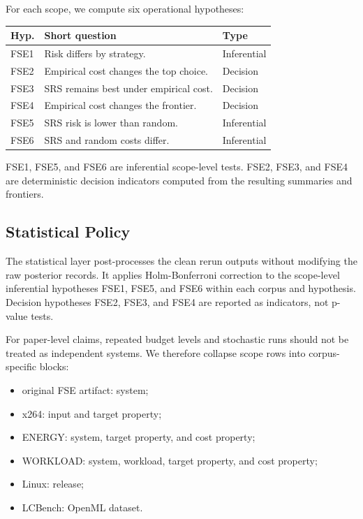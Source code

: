 \documentclass[smallcondensed]{svjour3}
\providecommand{\tightlist}{%
  \setlength{\itemsep}{0pt}\setlength{\parskip}{0pt}}
\begin{document}
For each scope, we compute six operational hypotheses:

\begin{longtable}[]{@{}lll@{}}
\toprule\noalign{}
Hyp. & Short question & Type \\
\midrule\noalign{}
\endhead
\bottomrule\noalign{}
\endlastfoot
FSE1 & Risk differs by strategy. & Inferential \\
FSE2 & Empirical cost changes the top choice. & Decision \\
FSE3 & SRS remains best under empirical cost. & Decision \\
FSE4 & Empirical cost changes the frontier. & Decision \\
FSE5 & SRS risk is lower than random. & Inferential \\
FSE6 & SRS and random costs differ. & Inferential \\
\end{longtable}

FSE1, FSE5, and FSE6 are inferential scope-level tests. FSE2, FSE3, and
FSE4 are deterministic decision indicators computed from the resulting
summaries and frontiers.

\subsection{Statistical Policy}\label{statistical-policy}

The statistical layer post-processes the clean rerun outputs without
modifying the raw posterior records. It applies Holm-Bonferroni
correction to the scope-level inferential hypotheses FSE1, FSE5, and
FSE6 within each corpus and hypothesis. Decision hypotheses FSE2, FSE3,
and FSE4 are reported as indicators, not p-value tests.

For paper-level claims, repeated budget levels and stochastic runs
should not be treated as independent systems. We therefore collapse
scope rows into corpus-specific blocks:

\begin{itemize}
\tightlist
\item
  original FSE artifact: system;
\item
  x264: input and target property;
\item
  ENERGY: system, target property, and cost property;
\item
  WORKLOAD: system, workload, target property, and cost property;
\item
  Linux: release;
\item
  LCBench: OpenML dataset.
\end{itemize}
\end{document}
